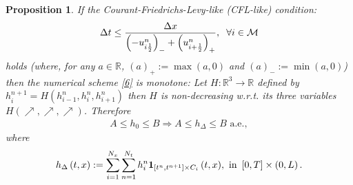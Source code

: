 \documentclass[11pt,a4paper,center,notitlepage]{article}
\numberwithin{equation}{section}
\newtheorem{prop}{Proposition}
\begin{document}
\begin{prop}
If the Courant-Friedrichs-Levy-like (CFL-like) condition: 
\begin{align}
\label{12}
\Delta t \le \frac{{\Delta x}}{{{{\left( { - u_{i  \frac{1}{2}}^n} \right)}_- } + {{\left( {u_{i + \frac{1}{2}}^n} \right)}_+ }}}, \hspace{2mm} \forall i \in \mathcal{M} 
\end{align}
holds (where, for any $a\in \mathbb{R}$, $\left(a\right)_+ := \max \left(a, 0\right)$ and $\left(a\right)_- := \min \left(a, 0\right)$) then the numerical scheme \eqref{6} is monotone: Let $H: \mathbb{R}^3 \to \mathbb{R}$ defined by $h_i^{n + 1} = H\left( {h_{i - 1}^n,h_i^n,h_{i + 1}^n} \right)$ then $H$ is non-decreasing w.r.t. its three variables $H\left( { \nearrow , \nearrow , \nearrow } \right)$. Therefore 
\begin{align*}
A \le h_0 \le B \Rightarrow A \le h_\Delta \le B \mbox{ a.e.},
\end{align*}
where
\begin{align*}
{h_\Delta }\left( {t,x} \right): = \sum\limits_{i = 1}^{{N_x}} {\sum\limits_{n = 1}^{{N_t}} {h_i^n{{\bf 1}_{\left[ {{t^n},{t^{n + 1}}} \right] \times {C_i}}}\left( {t,x} \right)} } , \mbox{ in } \left[ {0,T} \right] \times \left( {0,L} \right).
\end{align*}
\end{prop}
\end{document}
